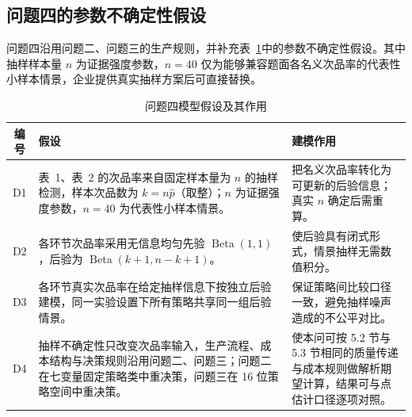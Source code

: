 \subsection{问题四的参数不确定性假设}

问题四沿用问题二、问题三的生产规则，并补充表~\ref{tab:q4-assumptions}中的参数不确定性假设。其中抽样样本量 $n$ 为证据强度参数，$n=40$ 仅为能够兼容题面各名义次品率的代表性小样本情景，企业提供真实抽样方案后可直接替换。
\begin{table}[H]
  \centering
  \caption{问题四模型假设及其作用}
  \label{tab:q4-assumptions}
  \begin{tabularx}{\textwidth}{c>{\raggedright\arraybackslash}p{}>{\raggedright\arraybackslash}X}
    \toprule
    编号 & 假设 & 建模作用 \\
    \midrule
    D1 & 表~1、表~2 的次品率来自固定样本量为 $n$ 的抽样检测，样本次品数为 $k=n\hat p$（取整）；$n$ 为证据强度参数，$n=40$ 为代表性小样本情景。 & 把名义次品率转化为可更新的后验信息；真实 $n$ 确定后需重算。 \\
    D2 & 各环节次品率采用无信息均匀先验 $\operatorname{Beta}(1,1)$，后验为 $\operatorname{Beta}(k+1,n-k+1)$。 & 使后验具有闭式形式，情景抽样无需数值积分。 \\
    D3 & 各环节真实次品率在给定抽样信息下按独立后验建模，同一实验设置下所有策略共享同一组后验情景。 & 保证策略间比较口径一致，避免抽样噪声造成的不公平对比。 \\
    D4 & 抽样不确定性只改变次品率输入，生产流程、成本结构与决策规则沿用问题二、问题三；问题二在七变量固定策略类中重决策，问题三在 16 位策略空间中重决策。 & 使本问可按 5.2 节与 5.3 节相同的质量传递与成本规则做解析期望计算，结果可与点估计口径逐项对照。 \\
    \bottomrule
  \end{tabularx}
\end{table}
